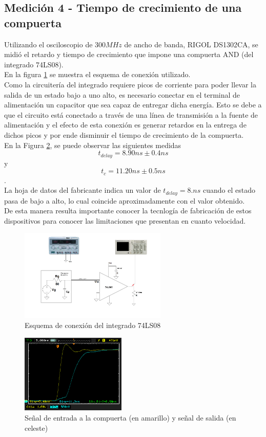 \documentclass[a4paper,10pt]{article}
\begin{document}
	\subsection{Medición 4 - Tiempo de crecimiento de una compuerta}
	\indent Utilizando el osciloscopio de $300MHz$ de ancho de banda, RIGOL 
	DS1302CA, se midi\'o el retardo y tiempo de crecimiento que impone una 
	compuerta AND (del integrado 74LS08). \\
	\indent En la figura \ref{banco} se muestra el esquema de conexi\'on 
	utilizado. \\
 	\indent Como la circuitería del integrado requiere picos de corriente para 
	poder llevar la salida de un estado bajo a uno alto, es necesario conectar 
	en el terminal de alimentación un capacitor que sea capaz de entregar dicha 
	energía. Esto se debe a que el circuito está conectado a través de una línea
	de transmisión a la fuente de alimentación y el efecto de esta conexión es 
	generar retardos en la entrega de dichos picos y por ende disminuir el 
	tiempo de crecimiento de la compuerta.\\
	\indent En la Figura \ref{img009}, se puede observar las siguientes medidas 
	$$t_{delay}=8.90ns \pm0.4ns$$y  $$t_{c}=11.20ns\pm0.5ns$$. \\
	\indent La hoja de datos del fabricante indica un valor de $t_{delay}=8.ns$ 
	cuando el estado pasa de bajo a alto, lo cual coincide aproximadamente con 
	el valor obtenido. \\
	\indent De esta manera resulta importante conocer la tecnlog\'ia de 
	fabricaci\'on de estos dispositivos para conocer las limitaciones que 
	presentan en cuanto velocidad.
	
		\begin{figure}[!htb]
				\centering
				\includegraphics[width=7cm]
				{Imagenes/banco.png}
				\caption{Esquema de conexi\'on del integrado 74LS08}
				\label{banco}
			\end{figure}
		
		\begin{figure}[!htb]
			\centering
			\includegraphics[width=5cm]
			{Imagenes/Risetime3.png}
			\caption{Se\~nal de entrada a la compuerta (en amarillo) y se\~nal 
			de salida (en celeste)}
			\label{img009}
		\end{figure}
\end{document}
